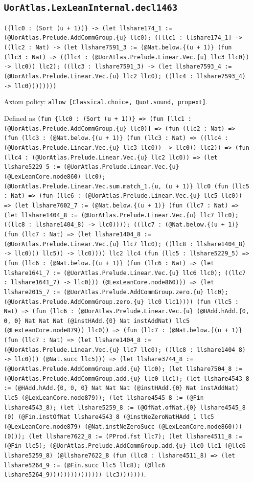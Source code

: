 \documentclass[11pt]{article}
\begin{document}
\subsection*{\texttt{UorAtlas.LexLeanInternal.decl1463}}
\noindent\texttt{(\{llc0 : (Sort (u + 1))\} -> (let llshare174\_1 := (@UorAtlas.Prelude.AddCommGroup.\{u\} llc0); ([llc1 : llshare174\_1] -> ((llc2 : Nat) -> (let llshare7591\_3 := (@Nat.below.\{(u + 1)\} (fun (llc3 : Nat) => ((llc4 : (@UorAtlas.Prelude.Linear.Vec.\{u\} llc3 llc0)) -> llc0)) llc2); ((llc3 : llshare7591\_3) -> (let llshare7593\_4 := (@UorAtlas.Prelude.Linear.Vec.\{u\} llc2 llc0); ((llc4 : llshare7593\_4) -> llc0))))))))}\par
\noindent Axiom policy: \texttt{allow [Classical.choice, Quot.sound, propext]}.\par
\noindent Defined as \texttt{(fun \{llc0 : (Sort (u + 1))\} => (fun [llc1 : (@UorAtlas.Prelude.AddCommGroup.\{u\} llc0)] => (fun (llc2 : Nat) => (fun (llc3 : (@Nat.below.\{(u + 1)\} (fun (llc3 : Nat) => ((llc4 : (@UorAtlas.Prelude.Linear.Vec.\{u\} llc3 llc0)) -> llc0)) llc2)) => (fun (llc4 : (@UorAtlas.Prelude.Linear.Vec.\{u\} llc2 llc0)) => (let llshare5229\_5 := (@UorAtlas.Prelude.Linear.Vec.\{u\} (@LexLeanCore.node860) llc0); (@UorAtlas.Prelude.Linear.Vec.sum.match\_1.\{u, (u + 1)\} llc0 (fun (llc5 : Nat) => (fun (llc6 : (@UorAtlas.Prelude.Linear.Vec.\{u\} llc5 llc0)) => (let llshare7602\_7 := (@Nat.below.\{(u + 1)\} (fun (llc7 : Nat) => (let llshare1404\_8 := (@UorAtlas.Prelude.Linear.Vec.\{u\} llc7 llc0); ((llc8 : llshare1404\_8) -> llc0)))); ((llc7 : (@Nat.below.\{(u + 1)\} (fun (llc7 : Nat) => (let llshare1404\_8 := (@UorAtlas.Prelude.Linear.Vec.\{u\} llc7 llc0); ((llc8 : llshare1404\_8) -> llc0))) llc5)) -> llc0)))) llc2 llc4 (fun (llc5 : llshare5229\_5) => (fun (llc6 : (@Nat.below.\{(u + 1)\} (fun (llc6 : Nat) => (let llshare1641\_7 := (@UorAtlas.Prelude.Linear.Vec.\{u\} llc6 llc0); ((llc7 : llshare1641\_7) -> llc0))) (@LexLeanCore.node860))) => (let llshare2015\_7 := (@UorAtlas.Prelude.AddCommGroup.zero.\{u\} llc0); (@UorAtlas.Prelude.AddCommGroup.zero.\{u\} llc0 llc1)))) (fun (llc5 : Nat) => (fun (llc6 : (@UorAtlas.Prelude.Linear.Vec.\{u\} (@HAdd.hAdd.\{0, 0, 0\} Nat Nat Nat (@instHAdd.\{0\} Nat instAddNat) llc5 (@LexLeanCore.node879)) llc0)) => (fun (llc7 : (@Nat.below.\{(u + 1)\} (fun (llc7 : Nat) => (let llshare1404\_8 := (@UorAtlas.Prelude.Linear.Vec.\{u\} llc7 llc0); ((llc8 : llshare1404\_8) -> llc0))) (@Nat.succ llc5))) => (let llshare3744\_8 := (@UorAtlas.Prelude.AddCommGroup.add.\{u\} llc0); (let llshare7504\_8 := (@UorAtlas.Prelude.AddCommGroup.add.\{u\} llc0 llc1); (let llshare4543\_8 := (@HAdd.hAdd.\{0, 0, 0\} Nat Nat Nat (@instHAdd.\{0\} Nat instAddNat) llc5 (@LexLeanCore.node879)); (let llshare4545\_8 := (@Fin llshare4543\_8); (let llshare5259\_8 := (@OfNat.ofNat.\{0\} llshare4545\_8 (0) (@Fin.instOfNat llshare4543\_8 (@instNeZeroNatHAdd\_1 llc5 (@LexLeanCore.node879) (@Nat.instNeZeroSucc (@LexLeanCore.node860))) (0))); (let llshare7622\_8 := (PProd.fst llc7); (let llshare4511\_8 := (@Fin llc5); (@UorAtlas.Prelude.AddCommGroup.add.\{u\} llc0 llc1 (@llc6 llshare5259\_8) (@llshare7622\_8 (fun (llc8 : llshare4511\_8) => (let llshare5264\_9 := (@Fin.succ llc5 llc8); (@llc6 llshare5264\_9))))))))))))))) llc3)))))))}.\par
\end{document}
